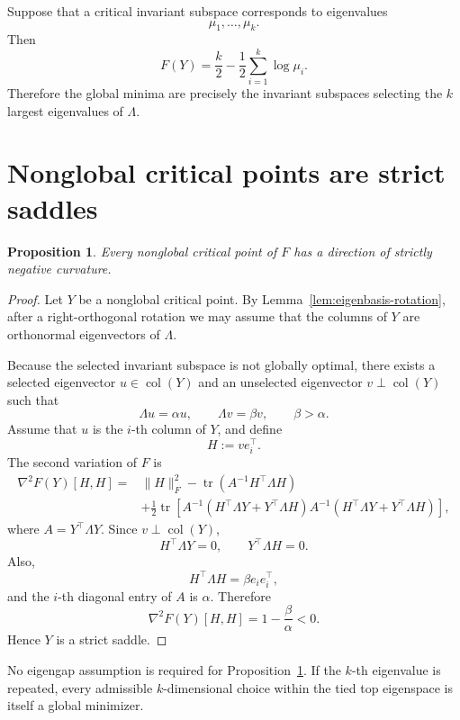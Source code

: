 \documentclass[11pt]{article}
\newcommand{\col}{\operatorname{col}}
\newcommand{\tr}{\operatorname{tr}}
\newtheorem{proposition}{Proposition}
\begin{document}
Suppose that a critical invariant subspace corresponds to eigenvalues
\[
\mu_1,\ldots,\mu_k.
\]
Then
\[
F(Y)
=
\frac{k}{2}
-
\frac12\sum_{i=1}^k\log\mu_i.
\tag{19}
\label{eq:critical-value}
\]
Therefore the global minima are precisely the invariant subspaces selecting
the \(k\) largest eigenvalues of \(\Lambda\).

\section{Nonglobal critical points are strict saddles}

\begin{proposition}
\label{prop:strict-saddle}
Every nonglobal critical point of \(F\) has a direction of strictly negative
curvature.
\end{proposition}

\begin{proof}
Let \(Y\) be a nonglobal critical point. By
Lemma~\ref{lem:eigenbasis-rotation}, after a right-orthogonal rotation we may
assume that the columns of \(Y\) are orthonormal eigenvectors of \(\Lambda\).

Because the selected invariant subspace is not globally optimal, there exists
a selected eigenvector \(u\in\col(Y)\) and an unselected eigenvector
\(v\perp\col(Y)\) such that
\[
\Lambda u=\alpha u,
\qquad
\Lambda v=\beta v,
\qquad
\beta>\alpha.
\]
Assume that \(u\) is the \(i\)-th column of \(Y\), and define
\[
H:=ve_i^\top.
\]
The second variation of \(F\) is
\[
\begin{aligned}
\nabla^2F(Y)[H,H]
={}&
\|H\|_F^2
-
\tr\left(A^{-1}H^\top\Lambda H\right)\\
&+
\frac12
\tr\left[
A^{-1}
\left(H^\top\Lambda Y+Y^\top\Lambda H\right)
A^{-1}
\left(H^\top\Lambda Y+Y^\top\Lambda H\right)
\right],
\end{aligned}
\tag{20}
\label{eq:second-variation}
\]
where \(A=Y^\top\Lambda Y\). Since \(v\perp\col(Y)\),
\[
H^\top\Lambda Y=0,
\qquad
Y^\top\Lambda H=0.
\]
Also,
\[
H^\top\Lambda H=\beta e_ie_i^\top,
\]
and the \(i\)-th diagonal entry of \(A\) is \(\alpha\). Therefore
\[
\nabla^2F(Y)[H,H]
=
1-\frac{\beta}{\alpha}
<0.
\]
Hence \(Y\) is a strict saddle.
\end{proof}

No eigengap assumption is required for Proposition~\ref{prop:strict-saddle}.
If the \(k\)-th eigenvalue is repeated, every admissible \(k\)-dimensional
choice within the tied top eigenspace is itself a global minimizer.
\end{document}
